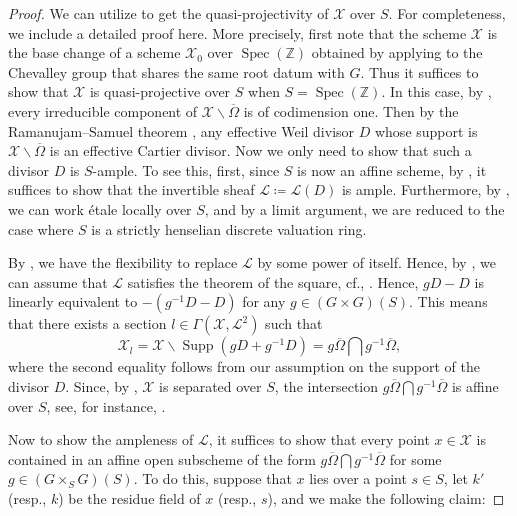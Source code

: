 \documentclass[11pt, reqno]{amsart}
\theoremstyle{plain}
\theoremstyle{definition}
\DeclareMathOperator{\Supp}{Supp}
\DeclareMathOperator{\Spec}{Spec}		%
\begin{document}
\begin{proof}   
     We can utilize
    \cite[Section~6.6, Theorem~2 (d)]{BLR} to get the quasi-projectivity of $\mathcal{X}$ over $S$. For completeness, we include a detailed proof here. More precisely, first note that the scheme $\mathcal{X}$ is the base change of a scheme $\mathcal{X}_0$ over $\Spec(\mathbb{Z})$ obtained by applying  to the Chevalley group that shares the same root datum with $G$. Thus it suffices to show that $\mathcal{X}$ is quasi-projective over $S$ when $S=\Spec(\mathbb{Z})$. In this case, by \cite[corollaire~21.12.7]{EGAIV4}, every irreducible component of $\mathcal{X}\backslash \overline{\Omega}$ is of codimension one. Then by the Ramanujam--Samuel theorem \cite[théorème~21.14.3]{EGAIV4}, any effective Weil divisor $D$ whose support is $\mathcal{X}\backslash \overline{\Omega}$ is an effective Cartier divisor. Now we only need to show that such a divisor $D$ is $S$-ample. To see this, first, 
    since $S$ is now an affine scheme, by \cite[chapitre~II, corollaire~4.6.6]{EGA2}, it suffices to show that the invertible sheaf $\mathcal{L}\coloneq\mathcal{L}(D)$ is ample. Furthermore, by \cite[corollaire~2.7.2]{EGAIV2}, we can work étale locally over $S$, and by a limit argument, we are reduced to the case where $S$ is a strictly henselian discrete valuation ring. 
    
    By \cite[proposition~4.5.6(i)]{EGA2}, we have the flexibility to replace $\mathcal{L}$ by some power of itself. Hence, by \cite[\S~6.3, Theorem~1]{BLR}, we can assume that $\mathcal{L}$ satisfies the theorem of the square, cf., \cite[\S~6.3]{BLR}. Hence, $gD-D$ is linearly equivalent to $-(g^{-1}D-D)$ for any $g\in (G\times G)(S)$. This means that there exists a section $l\in \Gamma(\mathcal{X}, \mathcal{L}^{2})$ such that 
$$\mathcal{X}_l=\mathcal{X}\backslash\Supp(gD+g^{-1}D)=g\overline{\Omega}\bigcap g^{-1}\overline{\Omega},$$
where the second equality follows from our assumption on the support of the divisor $D$. Since, by , $\mathcal{X}$ is separated over $S$, the intersection $g\overline{\Omega}\bigcap g^{-1}\overline{\Omega}$ is affine over $S$, see, for instance, \cite[01KP]{stacks-project}. 

Now to show the ampleness of $\mathcal{L}$, it suffices to show that every point $x\in\mathcal{X}$ is contained in an affine open subscheme of the form $g\overline{\Omega}\bigcap g^{-1}\overline{\Omega}$ for some $g\in (G\times_S G)(S)$. To do this, suppose that $x$ lies over a point $s\in S$, let $k'$ (resp., $k$) be the residue field of $x$ (resp., $s$), and we make the following claim:


\end{proof}
\end{document}
